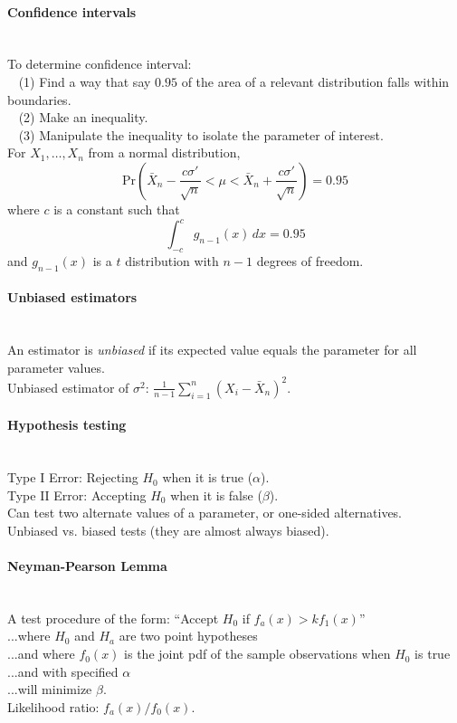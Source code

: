\documentclass[10pt]{article}
\begin{document}
\paragraph{Confidence intervals}\ \\
To determine confidence interval:\\
$\phantom{x}$ (1) Find a way that say $0.95$ of the area of a relevant distribution falls within boundaries.\\
$\phantom{x}$ (2) Make an inequality.\\
$\phantom{x}$ (3) Manipulate the inequality to isolate the parameter of interest.\\
For $X_1, \dotsc, X_n$ from a normal distribution,
\begin{equation*}
\text{Pr}(\bar{X}_n - \frac{c\sigma'}{\sqrt{n}} < \mu < \bar{X}_n + \frac{c\sigma'}{\sqrt{n}}) = 0.95
\end{equation*}
where $c$ is a constant such that
\begin{equation*}\int_{-c}^c g_{n-1}(x)\, dx = 0.95\end{equation*}
and $g_{n-1}(x)$ is a $t$ distribution with $n-1$ degrees of freedom.

\paragraph{Unbiased estimators}\ \\
An estimator is {\it unbiased} if its expected value equals the parameter for all parameter values.\\
Unbiased estimator of $\sigma^2$: $\frac{1}{n-1}\sum_{i=1}^n (X_i - \bar{X}_n)^2$.

\paragraph{Hypothesis testing}\ \\
Type I Error: Rejecting $H_0$ when it is true ($\alpha$).\\
Type II Error: Accepting $H_0$ when it is false ($\beta$).\\
Can test two alternate values of a parameter, or one-sided alternatives.\\
Unbiased vs. biased tests (they are almost always biased).

\paragraph{Neyman-Pearson Lemma}\ \\
A test procedure of the form: ``Accept $H_0$ if $f_a(x)>kf_1(x)$''\\
...where $H_0$ and $H_a$ are two point hypotheses\\
...and where $f_0(x)$ is the joint pdf of the sample observations when $H_0$ is true\\
...and with specified $\alpha$\\
...will minimize $\beta$.\\
Likelihood ratio: $f_a(x)/f_0(x)$.
\end{document}

